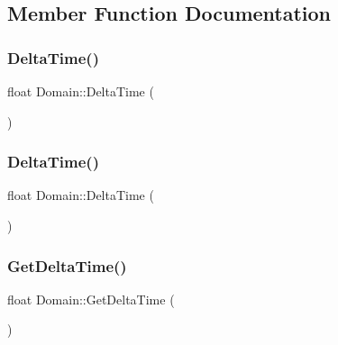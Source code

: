 \subsection{Member Function Documentation}
\mbox{\label{class_domain_aba45357664ea3ca0566e079f229ad6a2}} 
\subsubsection{\texorpdfstring{Delta\+Time()}{DeltaTime()}\hspace{0.1cm}{\footnotesize\ttfamily [1/2]}}
{\footnotesize\ttfamily float Domain\+::\+Delta\+Time (\begin{DoxyParamCaption}{ }\end{DoxyParamCaption})\hspace{0.3cm}{\ttfamily [private]}}

\mbox{\label{class_domain_aba45357664ea3ca0566e079f229ad6a2}} 
\subsubsection{\texorpdfstring{Delta\+Time()}{DeltaTime()}\hspace{0.1cm}{\footnotesize\ttfamily [2/2]}}
{\footnotesize\ttfamily float Domain\+::\+Delta\+Time (\begin{DoxyParamCaption}{ }\end{DoxyParamCaption})\hspace{0.3cm}{\ttfamily [private]}}

\mbox{\label{class_domain_a595099f01805b1c9975a4d20be49e995}} 
\subsubsection{\texorpdfstring{Get\+Delta\+Time()}{GetDeltaTime()}\hspace{0.1cm}{\footnotesize\ttfamily [1/2]}}
{\footnotesize\ttfamily float Domain\+::\+Get\+Delta\+Time (\begin{DoxyParamCaption}{ }\end{DoxyParamCaption})}

